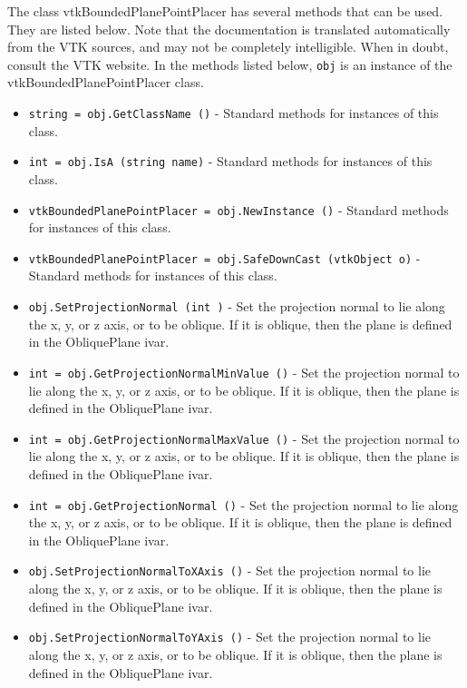 The class vtkBoundedPlanePointPlacer has several methods that can be used.
  They are listed below.
Note that the documentation is translated automatically from the VTK sources,
and may not be completely intelligible.  When in doubt, consult the VTK website.
In the methods listed below, \verb|obj| is an instance of the vtkBoundedPlanePointPlacer class.
\begin{itemize}
\item  \verb|string = obj.GetClassName ()| -  Standard methods for instances of this class.

\item  \verb|int = obj.IsA (string name)| -  Standard methods for instances of this class.

\item  \verb|vtkBoundedPlanePointPlacer = obj.NewInstance ()| -  Standard methods for instances of this class.

\item  \verb|vtkBoundedPlanePointPlacer = obj.SafeDownCast (vtkObject o)| -  Standard methods for instances of this class.

\item  \verb|obj.SetProjectionNormal (int )| -  Set the projection normal to lie along the x, y, or z axis,
 or to be oblique. If it is oblique, then the plane is 
 defined in the ObliquePlane ivar.

\item  \verb|int = obj.GetProjectionNormalMinValue ()| -  Set the projection normal to lie along the x, y, or z axis,
 or to be oblique. If it is oblique, then the plane is 
 defined in the ObliquePlane ivar.

\item  \verb|int = obj.GetProjectionNormalMaxValue ()| -  Set the projection normal to lie along the x, y, or z axis,
 or to be oblique. If it is oblique, then the plane is 
 defined in the ObliquePlane ivar.

\item  \verb|int = obj.GetProjectionNormal ()| -  Set the projection normal to lie along the x, y, or z axis,
 or to be oblique. If it is oblique, then the plane is 
 defined in the ObliquePlane ivar.

\item  \verb|obj.SetProjectionNormalToXAxis ()| -  Set the projection normal to lie along the x, y, or z axis,
 or to be oblique. If it is oblique, then the plane is 
 defined in the ObliquePlane ivar.

\item  \verb|obj.SetProjectionNormalToYAxis ()| -  Set the projection normal to lie along the x, y, or z axis,
 or to be oblique. If it is oblique, then the plane is 
 defined in the ObliquePlane ivar.


\end{itemize}
